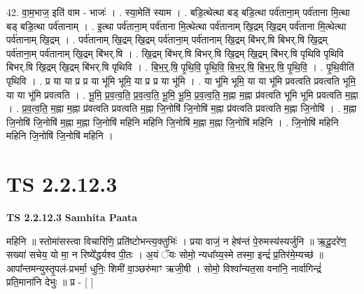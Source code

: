 \documentclass[17pt]{extarticle}
\begin{document}
42. वा॒म॒भाज॒ इति॑ वाम - भाजः॑ । . स्या॒मेति॑ स्याम । . बडि॒त्थेत्था बड् बडि॒त्था पर्व॑ताना॒म् पर्व॑ताना मि॒त्था बड् बडि॒त्था पर्व॑तानाम् । . इ॒त्था पर्व॑ताना॒म् पर्व॑ताना मि॒त्थेत्था पर्व॑तानाम् खि॒द्रम् खि॒द्रम् पर्व॑ताना मि॒त्थेत्था पर्व॑तानाम् खि॒द्रम् । . पर्व॑तानाम् खि॒द्रम् खि॒द्रम् पर्व॑ताना॒म् पर्व॑तानाम् खि॒द्रम् बि॑भर्.षि बिभर्.षि खि॒द्रम् पर्व॑ताना॒म् पर्व॑तानाम् खि॒द्रम् बि॑भर्.षि । . खि॒द्रम् बि॑भर्.षि बिभर्.षि खि॒द्रम् खि॒द्रम् बि॑भर्.षि पृथिवि पृथिवि बिभर्.षि खि॒द्रम् खि॒द्रम् बि॑भर्.षि पृथिवि । . बि॒भ॒र्॒.षि॒ पृ॒थि॒वि॒ पृ॒थि॒वि॒ बि॒भ॒र्॒.षि॒ बि॒भ॒र्॒.षि॒ पृ॒थि॒वि॒ । . पृ॒थि॒वीति॑ पृथिवि । . प्र या या प्र प्र या भू॑मि भूमि॒ या प्र प्र या भू॑मि । . या भू॑मि भूमि॒ या या भू॑मि प्रवत्वति प्रवत्वति भूमि॒ या या भू॑मि प्रवत्वति । . भू॒मि॒ प्र॒व॒त्व॒ति॒ प्र॒व॒त्व॒ति॒ भू॒मि॒ भू॒मि॒ प्र॒व॒त्व॒ति॒ म॒ह्ना म॒ह्ना प्र॑वत्वति भूमि भूमि प्रवत्वति म॒ह्ना । . प्र॒व॒त्व॒ति॒ म॒ह्ना म॒ह्ना प्र॑वत्वति प्रवत्वति म॒ह्ना जि॒नोषि॑ जि॒नोषि॑ म॒ह्ना प्र॑वत्वति प्रवत्वति म॒ह्ना जि॒नोषि॑ । . म॒ह्ना जि॒नोषि॑ जि॒नोषि॑ म॒ह्ना म॒ह्ना जि॒नोषि॑ महिनि महिनि जि॒नोषि॑ म॒ह्ना म॒ह्ना जि॒नोषि॑ महिनि । . जि॒नोषि॑ महिनि महिनि जि॒नोषि॑ जि॒नोषि॑ महिनि । \newline
\pagebreak
{}
\section*{ TS 2.2.12.3 }

\textbf{TS 2.2.12.3 } \newline
\textbf{Samhita Paata} \newline

महिनि ॥ स्तोमा॑सस्त्वा विचारिणि॒ प्रति॑ष्टोभन्त्य॒क्तुभिः॑ । प्रया वाजं॒ न हेष॑न्तं पे॒रुमस्य॑स्यर्जुनि ॥ ऋ॒दू॒दरे॑ण॒ सख्या॑ सचेय॒ यो मा॒ न रिष्ये᳚द्धर्यश्व पी॒तः । अ॒यं ॅयः सोमो॒ न्यधा᳚य्य॒स्मे तस्मा॒ इन्द्रं॑ प्र॒तिर॑मे॒म्यच्छ॑ ॥ आपा᳚न्तमन्युस्तृ॒पल॑-प्रभर्मा॒ धुनिः॒ शिमी॑ वा॒ञ्छरु॑माꣳ ऋजी॒षी । सोमो॒ विश्वा᳚न्यत॒सा वना॑नि॒ नार्वागिन्द्रं॑ प्रति॒माना॑नि देभुः ॥ प्र - [  ] \newline
\end{document}
